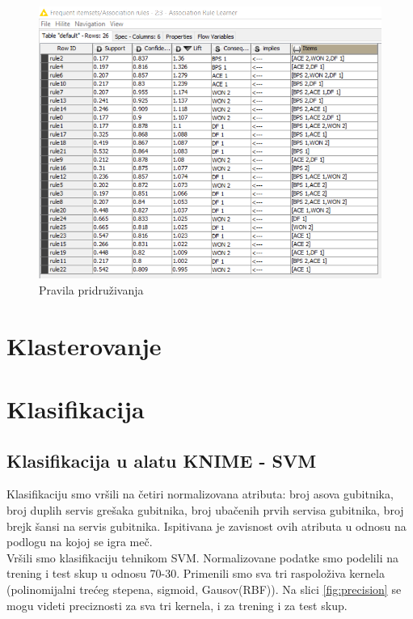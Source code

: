 \documentclass[a4paper]{article}
\begin{document}
\begin{figure}[h!]
	\begin{center}
		\includegraphics[scale=0.6]{KNIME_project/PravilaPridruzivanja/rule_learner_2009}
	\end{center}
	\caption{Pravila pridruživanja}
	\label{fig:rule_learner}
\end{figure}




\section{Klasterovanje}

\section{Klasifikacija}

\subsection{Klasifikacija u alatu KNIME - SVM}

Klasifikaciju smo vršili na četiri normalizovana atributa: broj asova gubitnika, broj duplih servis grešaka gubitnika,
broj ubačenih prvih servisa gubitnika, broj brejk šansi na servis gubitnika. Ispitivana je zavisnost ovih atributa u odnosu 
na podlogu na kojoj se igra meč.  \\

Vršili smo klasifikaciju tehnikom SVM. Normalizovane podatke smo podelili na trening i test skup u odnosu 70-30.
Primenili smo sva tri raspoloživa kernela (polinomijalni trećeg stepena, sigmoid, Gausov(RBF)).
Na slici \ref{fig:precision} se mogu videti preciznosti za sva tri kernela, i za trening i za test skup.
\end{document}
